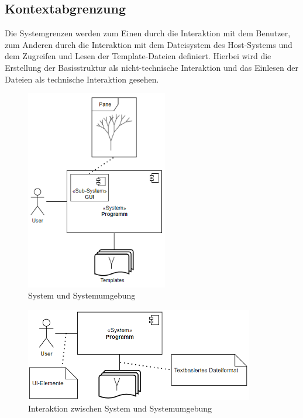 \subsection*{Kontextabgrenzung}
Die Systemgrenzen werden zum Einen durch die Interaktion mit dem Benutzer, zum Anderen durch die Interaktion mit
dem Dateisystem des Host-Systems und dem Zugreifen und Lesen der Template-Dateien definiert.
Hierbei wird die Erstellung der Basisstruktur als nicht-technische Interaktion und das Einlesen der Dateien als
technische Interaktion gesehen.
\begin{figure}[H]
    \centering
    \includegraphics[width=6.2cm]{../images/Fachlicher_Kontext.PNG}
    \caption{System und Systemumgebung}
\end{figure}
\begin{figure}[H]
    \centering
    \includegraphics[width=10cm]{../images/Technischer_Kontext.PNG}
    \caption{Interaktion zwischen System und Systemumgebung}
\end{figure}

